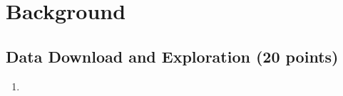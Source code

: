 \documentclass[
  letterpaper,
  DIV=11,
  numbers=noendperiod]{scrartcl}
\providecommand{\tightlist}{%
  \setlength{\itemsep}{0pt}\setlength{\parskip}{0pt}}\usepackage{longtable,booktabs,array}
\begin{document}
\section*{Background}\label{background}

\subsection*{Data Download and Exploration (20
points)}\label{data-download-and-exploration-20-points}

\begin{enumerate}
\def\labelenumi{\arabic{enumi}.}
\tightlist
\item
\end{enumerate}
\end{document}
